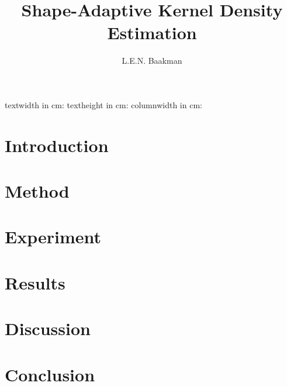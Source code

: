 \documentclass[10pt, a4paper, twocolumn]{article}
\title{Shape-Adaptive Kernel Density Estimation}
\author{L.E.N. Baakman}
\begin{document}
\twocolumn[
  \begin{@twocolumnfalse}
    \maketitle
		\begin{abstract}
			
		\end{abstract}
  \end{@twocolumnfalse}
]


textwidth in cm: \prntlen{\textwidth}
textheight in cm: \prntlen{\textheight}
columnwidth in cm: \prntlen{\columnwidth }


\section{Introduction}
\label{s:introduction}


\section{Method}
\label{s:method}


\section{Experiment}
\label{s:experiment}


\section{Results}
\label{s:results}


\section{Discussion}
\label{s:discussion}


\section{Conclusion}
\label{s:conclusion}

	
\printbibliography
\end{document}
